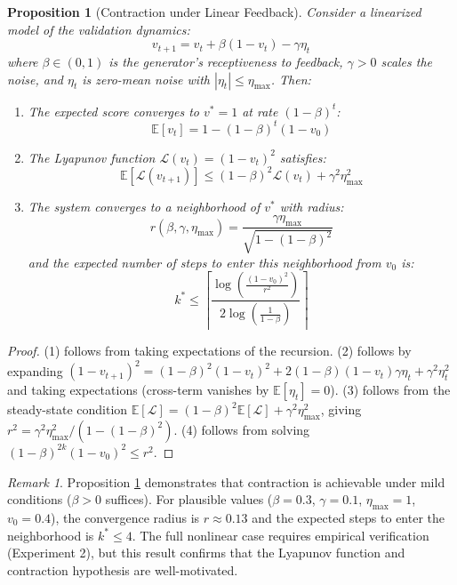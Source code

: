 \documentclass[11pt,a4paper]{article}
\newtheorem{proposition}{Proposition}[section]
\theoremstyle{remark}
\newtheorem{remark}{Remark}[section]
\newcommand{\E}{\mathbb{E}}
\begin{document}
\begin{proposition}[Contraction under Linear Feedback]
\label{prop:linear_contraction}
Consider a linearized model of the validation dynamics:
\begin{equation}
  v_{t+1} = v_t + \beta(1 - v_t) - \gamma \eta_t
\end{equation}
where $\beta \in (0, 1)$ is the generator's receptiveness to feedback, $\gamma > 0$ scales the noise, and $\eta_t$ is zero-mean noise with $|\eta_t| \leq \eta_{\max}$. Then:
\begin{enumerate}
  \item The expected score converges to $v^* = 1$ at rate $(1 - \beta)^t$:
  \begin{equation}
    \E[v_t] = 1 - (1 - \beta)^t (1 - v_0)
  \end{equation}
  \item The Lyapunov function $\mathcal{L}(v_t) = (1 - v_t)^2$ satisfies:
  \begin{equation}
    \E[\mathcal{L}(v_{t+1})] \leq (1-\beta)^2 \mathcal{L}(v_t) + \gamma^2 \eta_{\max}^2
  \end{equation}
  \item The system converges to a neighborhood of $v^*$ with radius:
  \begin{equation}
    r(\beta, \gamma, \eta_{\max}) = \frac{\gamma \eta_{\max}}{\sqrt{1 - (1-\beta)^2}}
  \end{equation}
  and the expected number of steps to enter this neighborhood from $v_0$ is:
  \begin{equation}
    k^* \leq \left\lceil \frac{\log\left(\frac{(1 - v_0)^2}{r^2}\right)}{2 \log\left(\frac{1}{1-\beta}\right)} \right\rceil
  \end{equation}
\end{enumerate}
\end{proposition}

\begin{proof}
(1) follows from taking expectations of the recursion. (2) follows by expanding $(1 - v_{t+1})^2 = (1-\beta)^2(1-v_t)^2 + 2(1-\beta)(1-v_t)\gamma\eta_t + \gamma^2\eta_t^2$ and taking expectations (cross-term vanishes by $\E[\eta_t] = 0$). (3) follows from the steady-state condition $\E[\mathcal{L}] = (1-\beta)^2 \E[\mathcal{L}] + \gamma^2\eta_{\max}^2$, giving $r^2 = \gamma^2\eta_{\max}^2 / (1-(1-\beta)^2)$. (4) follows from solving $(1-\beta)^{2k}(1-v_0)^2 \leq r^2$.
\end{proof}

\begin{remark}
Proposition \ref{prop:linear_contraction} demonstrates that contraction is achievable under mild conditions ($\beta > 0$ suffices). For plausible values ($\beta = 0.3$, $\gamma = 0.1$, $\eta_{\max} = 1$, $v_0 = 0.4$), the convergence radius is $r \approx 0.13$ and the expected steps to enter the neighborhood is $k^* \leq 4$. The full nonlinear case requires empirical verification (Experiment 2), but this result confirms that the Lyapunov function and contraction hypothesis are well-motivated.
\end{remark}
\end{document}
